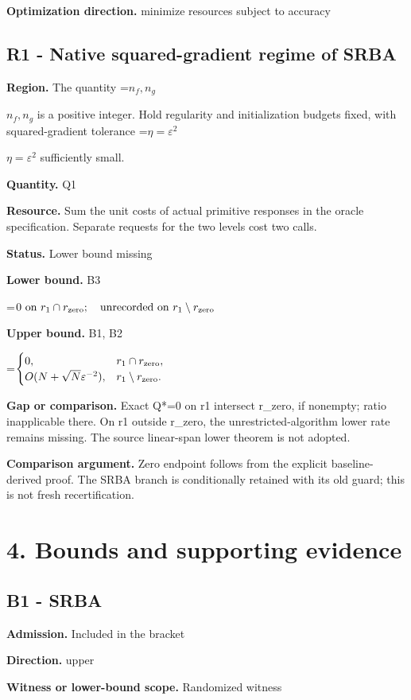\documentclass[10pt,a4paper]{article}
\newcommand{\AtlasMath}[1]{\par\begingroup\centering\setbox0=\hbox{$\displaystyle #1$}\ifdim\wd0>1.4\linewidth\typeout{ATLAS WIDE FORMULA: \the\wd0}\fi\ifdim\wd0>\linewidth\resizebox{\linewidth}{!}{\box0}\else\box0\fi\par\endgroup}
\newcommand{\AtlasInlineMath}[1]{\begingroup\setbox0=\hbox{$#1$}\ifdim\wd0>.4\linewidth\endgroup\AtlasMath{#1}\else\endgroup$#1$\fi}
\begin{document}
\textbf{Optimization direction.} minimize resources subject to accuracy

\subsection{R1 - Native squared-gradient regime of SRBA}
\textbf{Region.} The quantity \AtlasInlineMath{n_f,n_g} is a positive integer. Hold regularity and initialization budgets fixed, with squared-gradient tolerance \AtlasInlineMath{\eta=\varepsilon^2} sufficiently small.

\textbf{Quantity.} Q1

\textbf{Resource.} Sum the unit costs of actual primitive responses in the oracle specification. Separate requests for the two levels cost two calls.

\textbf{Status.} Lower bound missing

\textbf{Lower bound.} B3

\AtlasMath{0\text{ on }r_1\cap r_{\rm zero};\quad\text{unrecorded on }r_1\setminus r_{\rm zero}}
\textbf{Upper bound.} B1, B2

\AtlasMath{\begin{cases}0,&r_1\cap r_{\rm zero},\\O(N+\sqrt{N}\varepsilon^{-2}),&r_1\setminus r_{\rm zero}.\end{cases}}
\textbf{Gap or comparison.} Exact Q*=0 on r1 intersect r\_\allowbreak{}zero, if nonempty; ratio inapplicable there. On r1 outside r\_\allowbreak{}zero, the unrestricted-algorithm lower rate remains missing. The source linear-span lower theorem is not adopted.

\textbf{Comparison argument.} Zero endpoint follows from the explicit baseline-derived proof. The SRBA branch is conditionally retained with its old guard; this is not fresh recertification.

\section{4. Bounds and supporting evidence}
\subsection{B1 - SRBA}
\textbf{Admission.} Included in the bracket

\textbf{Direction.} upper

\textbf{Witness or lower-bound scope.} Randomized witness
\end{document}
